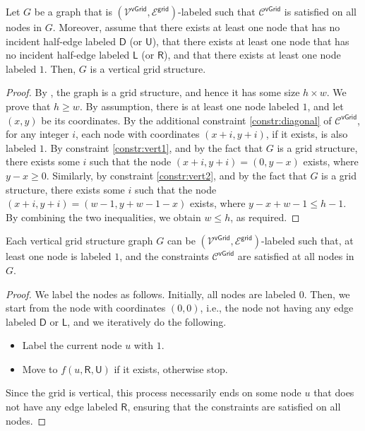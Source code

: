 \documentclass[11pt]{article}
\newcommand{\lleft}{\mathsf {L}}
\newcommand{\lright}{\mathsf {R}}
\newcommand{\lup}{\mathsf {U}}
\newcommand{\ldown}{\mathsf {D}}
\newcommand{\lgrid}{\mathsf {grid}}
\newcommand{\lvgrid}{\mathsf {vGrid}}
\begin{document}
\begin{lemma}\label{lem:vgrid}
	Let $G$ be a graph that is $(\mathcal{V^\lvgrid},\mathcal{E^\lgrid})$-labeled such that $\mathcal{C}^{\lvgrid}$ is satisfied on all nodes in $G$. Moreover, assume that there exists at least one node that has no incident half-edge labeled $\ldown$ (or $\lup$), that there exists at least one node that has no incident half-edge labeled $\lleft$ (or $\lright$), and that there exists at least one node labeled $1$. Then, $G$ is a vertical grid structure.
\end{lemma}
\begin{proof}
	By , the graph is a grid structure, and hence it has some size $h \times w$. We prove that $h \ge w$. By assumption, there is at least one node labeled $1$, and let $(x,y)$ be its coordinates. By the additional constraint \ref{constr:diagonal} of $\mathcal{C}^{\lvgrid}$, for any integer $i$, each node with coordinates $(x+i,y+i)$, if it exists, is also labeled $1$. By constraint \ref{constr:vert1}, and by the fact that $G$ is a grid structure, there exists some $i$ such that the node $(x+i,y+i) = (0,y-x)$ exists, where $y-x \ge 0$. Similarly, by constraint \ref{constr:vert2}, and by the fact that $G$ is a grid structure, there exists some $i$ such that the node $(x+i,y+i) = (w-1,y + w - 1 - x)$ exists, where $y - x + w - 1 \le h -1$. By combining the two inequalities, we obtain $w \le h$, as required.
\end{proof}
\begin{lemma}\label{lem:vgrid2}
	Each vertical grid structure graph $G$ can be $(\mathcal{V^\lvgrid},\mathcal{E^\lgrid})$-labeled such that, at least one node is labeled $1$, and the constraints $\mathcal{C}^{\lvgrid}$ are satisfied at all nodes in $G$. 
\end{lemma}
\begin{proof}
	We label the nodes as follows. Initially, all nodes are labeled $0$. Then, we start from the node with coordinates $(0,0)$, i.e., the node not having any edge labeled $\ldown$ or $\lleft$, and we iteratively do the following. 
	\begin{itemize}[noitemsep]
		\item Label the current node $u$ with $1$.
		\item Move to $f(u,\lright,\lup)$ if it exists, otherwise stop.
	\end{itemize}
	Since the grid is vertical, this process necessarily ends on some node $u$ that does not have any edge labeled $\lright$, ensuring that the constraints are satisfied on all nodes.
\end{proof}
\end{document}
